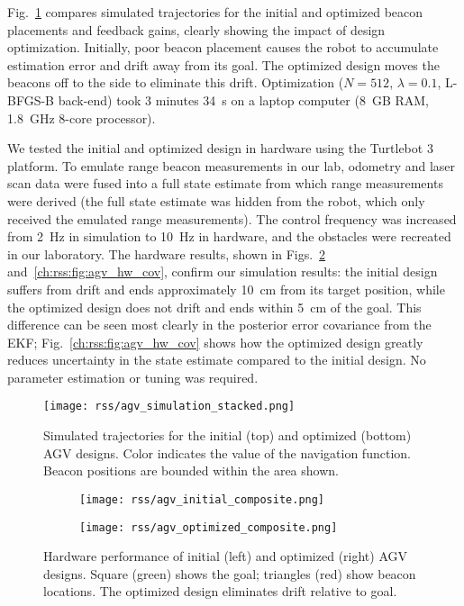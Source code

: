 Fig.~\ref{ch:rss:fig:agv_representative_trajectories} compares simulated trajectories for the initial and optimized beacon placements and feedback gains, clearly showing the impact of design optimization. Initially, poor beacon placement causes the robot to accumulate estimation error and drift away from its goal. The optimized design moves the beacons off to the side to eliminate this drift. Optimization ($N=512$, $\lambda=0.1$, L-BFGS-B back-end) took 3 minutes \SI{34}{s} on a laptop computer (\SI{8}{GB} RAM, \SI{1.8}{GHz} 8-core processor).

We tested the initial and optimized design in hardware using the Turtlebot 3 platform. To emulate range beacon measurements in our lab, odometry and laser scan data were fused into a full state estimate from which range measurements were derived (the full state estimate was hidden from the robot, which only received the emulated range measurements). The control frequency was increased from \SI{2}{Hz} in simulation to \SI{10}{Hz} in hardware, and the obstacles were recreated in our laboratory. The hardware results, shown in Figs.~\ref{ch:rss:fig:agv_hw} and~\ref{ch:rss:fig:agv_hw_cov}, confirm our simulation results: the initial design suffers from drift and ends approximately \SI{10}{cm} from its target position, while the optimized design does not drift and ends within \SI{5}{cm} of the goal. This difference can be seen most clearly in the posterior error covariance from the EKF;  Fig.~\ref{ch:rss:fig:agv_hw_cov} shows how the optimized design greatly reduces uncertainty in the state estimate compared to the initial design. No parameter estimation or tuning was required.

\begin{figure}[tb]
    \centering
    \texttt{[image: rss/agv\_simulation\_stacked.png]}
    \caption{Simulated trajectories for the initial (top) and optimized (bottom) AGV designs. Color indicates the value of the navigation function. Beacon positions are bounded within the area shown.}
    \label{ch:rss:fig:agv_representative_trajectories}
\end{figure}

\begin{figure}[tb]
    \centering
    \begin{subfigure}[t]{0.5\linewidth}
        \centering
        \texttt{[image: rss/agv\_initial\_composite.png]}
    \end{subfigure}%
    \begin{subfigure}[t]{0.5\linewidth}
        \centering
        \texttt{[image: rss/agv\_optimized\_composite.png]}
    \end{subfigure}
    \caption{Hardware performance of initial (left) and optimized (right) AGV designs. Square (green) shows the goal; triangles (red) show beacon locations. The optimized design eliminates drift relative to goal.}
    \label{ch:rss:fig:agv_hw}
\end{figure}

